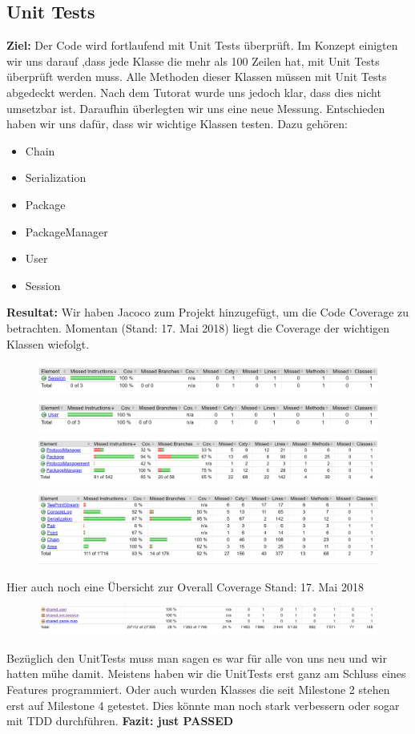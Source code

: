 \documentclass[]{scrartcl}
\begin{document}
\subsection{Unit Tests}
\textbf{Ziel:} Der Code wird fortlaufend mit Unit Tests überprüft.
Im Konzept einigten wir uns darauf ,dass jede Klasse die mehr als 100 Zeilen hat, mit Unit Tests überprüft werden muss. Alle Methoden dieser Klassen müssen mit Unit Tests abgedeckt werden. Nach dem Tutorat wurde uns jedoch klar, dass dies nicht umsetzbar ist. Daraufhin überlegten wir uns eine neue Messung. Entschieden haben wir uns dafür, dass wir wichtige Klassen testen. Dazu gehören:
\begin{itemize}
	\item Chain
	\item Serialization
	\item Package
	\item PackageManager
	\item User
	\item Session
\end{itemize} 
\textbf{Resultat:} 
Wir haben Jacoco zum Projekt hinzugefügt, um die Code Coverage zu betrachten. Momentan (Stand: 17. Mai 2018) liegt die Coverage der wichtigen Klassen wiefolgt.
\begin{figure}[H]
	\includegraphics[width=\linewidth]{coverage/session.png}
	\includegraphics[width=\linewidth]{coverage/user.png}
	\includegraphics[width=\linewidth]{coverage/package.png}
	\includegraphics[width=\linewidth]{coverage/util.png}
\end{figure}
Hier auch noch eine Übersicht zur Overall Coverage Stand: 17. Mai 2018
\begin{figure}[H]
	\includegraphics[width=\linewidth]{coverage/overall4.png}
\end{figure}
Bezüglich den UnitTests muss man sagen es war für alle von uns neu und wir hatten mühe damit. Meistens haben wir die UnitTests erst ganz am Schluss eines Features programmiert. Oder auch wurden Klasses die seit Milestone 2 stehen erst auf Milestone 4 getestet. Dies könnte man noch stark verbessern oder sogar mit TDD durchführen.
\textbf{Fazit: just PASSED}
\end{document}
